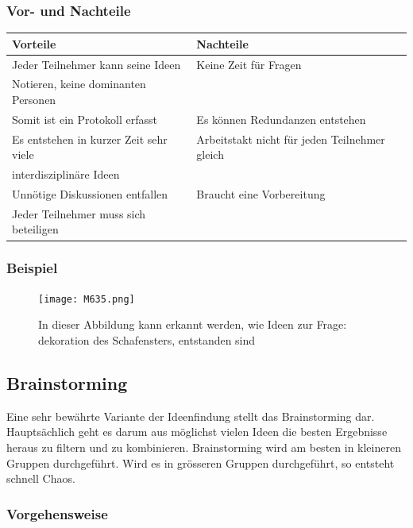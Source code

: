 \subsubsection{Vor- und Nachteile}
\begin{tabular}{|l|l|}
	\hline 
	\textbf{Vorteile} & \textbf{Nachteile} \\ 
	\hline 
	Jeder Teilnehmer kann seine Ideen & Keine Zeit für Fragen  \\
	 Notieren, keine dominanten Personen&\\ 
	\hline 
	Somit ist ein Protokoll erfasst&Es können Redundanzen entstehen \\ 
	\hline 
	Es entstehen in kurzer Zeit sehr viele&Arbeitstakt nicht für jeden Teilnehmer gleich\\
	interdisziplinäre Ideen&  \\ 
	\hline 
	Unnötige Diskussionen entfallen&Braucht eine Vorbereitung \\ 
	\hline 
	Jeder Teilnehmer muss sich beteiligen&  \\ 
	\hline 
\end{tabular} 
\subsubsection{Beispiel}
\begin{figure}[H]
	\centering
	\texttt{[image: M635.png]}
	\caption{In dieser Abbildung kann erkannt werden, wie Ideen zur Frage: dekoration des Schafensters, entstanden sind}
\end{figure}
\newpage
\subsection{Brainstorming}\label{subsec:Brainstorming}

Eine sehr bewährte Variante der Ideenfindung stellt das Brainstorming dar. Hauptsächlich geht es darum aus möglichst vielen Ideen die besten Ergebnisse heraus zu filtern und zu kombinieren. Brainstorming wird am besten in kleineren Gruppen durchgeführt. Wird es in grösseren Gruppen durchgeführt, so entsteht schnell Chaos.

\subsubsection{Vorgehensweise}

